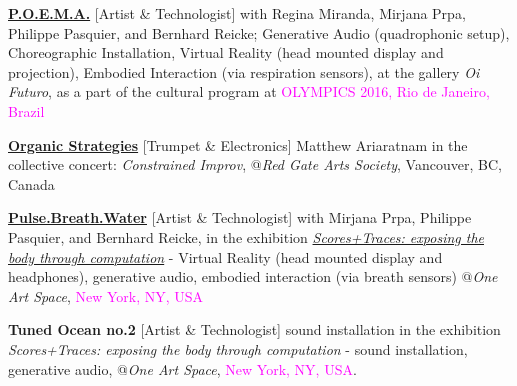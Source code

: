 \documentclass[10pt,a4paper]{moderncv} %
\begin{document}
{


 {\textbf{\href{https://kivanctatar.com/POEMA}{P.O.E.M.A.}} [Artist \& Technologist] with Regina Miranda, Mirjana Prpa, Philippe Pasquier, and Bernhard Reicke; Generative Audio (quadrophonic setup), Choreographic Installation, Virtual Reality (head mounted display and projection), Embodied Interaction (via respiration sensors), at the gallery \textit{Oi Futuro}, as a part of the cultural program at \textcolor{magenta}{OLYMPICS 2016, Rio de Janeiro, Brazil}}


 {\href{https://kivanctatar.com/Organic-Strategies}{\textbf{Organic Strategies}} [Trumpet \& Electronics] Matthew Ariaratnam in the collective concert: \textit{Constrained Improv}, @\textit{Red Gate Arts Society}, Vancouver, BC, Canada}

 {\href{https://kivanctatar.com/Pulse-Breath-Water}{\textbf{Pulse.Breath.Water}} [Artist \& Technologist] with Mirjana Prpa, Philippe Pasquier, and Bernhard Reicke, in the exhibition \href{http://oneartspace.com/2016/03/10/scorestraces-exposing-the-body-through-computation/}{\textit{Scores+Traces: exposing the body through computation}} - Virtual Reality (head mounted display and headphones), generative audio, embodied interaction (via breath sensors) @\textit{One Art Space}, \textcolor{magenta}{New York, NY, USA}}

 {\textbf{Tuned Ocean no.2} [Artist \& Technologist] sound installation in the exhibition \textit{Scores+Traces: exposing the body through computation}  - sound installation, generative audio, @\textit{One Art Space}, \textcolor{magenta}{New York, NY, USA}.}

}
\end{document}
